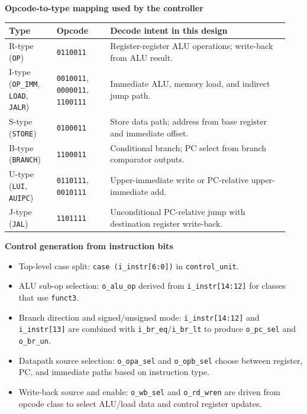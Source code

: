 \documentclass[10pt,a4paper]{article}
\begin{document}
\textbf{Opcode-to-type mapping used by the controller}

\begin{center}
\small
\begin{tabular}{@{}p{0.16\linewidth}p{0.18\linewidth}p{0.60\linewidth}@{}}
\toprule
\textbf{Type} & \textbf{Opcode} & \textbf{Decode intent in this design} \\
\midrule
R-type (\texttt{OP}) & \texttt{0110011} & Register-register ALU operations; write-back from ALU result. \\
I-type (\texttt{OP\_IMM}, \texttt{LOAD}, \texttt{JALR}) & \texttt{0010011}, \texttt{0000011}, \texttt{1100111} & Immediate ALU, memory load, and indirect jump path. \\
S-type (\texttt{STORE}) & \texttt{0100011} & Store data path; address from base register and immediate offset. \\
B-type (\texttt{BRANCH}) & \texttt{1100011} & Conditional branch; PC select from branch comparator outputs. \\
U-type (\texttt{LUI}, \texttt{AUIPC}) & \texttt{0110111}, \texttt{0010111} & Upper-immediate write or PC-relative upper-immediate add. \\
J-type (\texttt{JAL}) & \texttt{1101111} & Unconditional PC-relative jump with destination register write-back. \\
\bottomrule
\end{tabular}
\end{center}

\textbf{Control generation from instruction bits}

\begin{itemize}
  \item Top-level case split: \texttt{case (i\_instr[6:0])} in
        \texttt{control\_unit}.
  \item ALU sub-op selection: \texttt{o\_alu\_op} derived from
        \texttt{i\_instr[14:12]} for classes that use \texttt{funct3}.
  \item Branch direction and signed/unsigned mode:
        \texttt{i\_instr[14:12]} and \texttt{i\_instr[13]} are combined with
        \texttt{i\_br\_eq}/\texttt{i\_br\_lt} to produce \texttt{o\_pc\_sel} and
        \texttt{o\_br\_un}.
  \item Datapath source selection: \texttt{o\_opa\_sel} and
        \texttt{o\_opb\_sel} choose between register, PC, and immediate paths
        based on instruction type.
  \item Write-back source and enable: \texttt{o\_wb\_sel} and
        \texttt{o\_rd\_wren} are driven from opcode class to select ALU/load
        data and control register updates.
\end{itemize}
\end{document}
